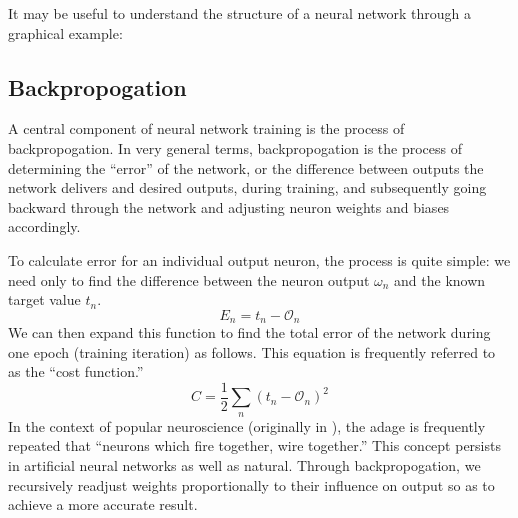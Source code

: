 \documentclass{article}
\begin{document}
It may be useful to understand the structure of a neural network through a graphical example:
\begin{center}
\end{center}

\subsection{Backpropogation}
A central component of neural network training is the process of backpropogation. In very general terms, backpropogation is the process of determining the ``error'' of the network, or the difference between outputs the network delivers and desired outputs, during training, and subsequently going backward through the network and adjusting neuron weights and biases accordingly.

To calculate error for an individual output neuron, the process is quite simple: we need only to find the difference between the neuron output $\omega_n$ and the known target value $t_n$.
$$E_n=t_n-\mathcal{O}_n$$
We can then expand this function to find the total error of the network during one epoch (training iteration) as follows. This equation is frequently referred to as the ``cost function.'' \cite{mediummlbasics}
$$C=\frac{1}{2}\sum_n(t_n-\mathcal{O}_n)^2$$
In the context of popular neuroscience (originally in \cite{neuronsfire}), the adage is frequently repeated that ``neurons which fire together, wire together.'' This concept persists in artificial neural networks as well as natural. Through backpropogation, we recursively readjust weights proportionally to their influence on output so as to achieve a more accurate result.
\end{document}
